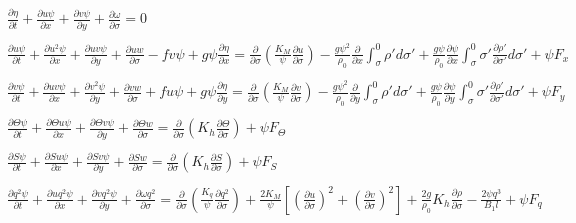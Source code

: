 \documentclass[oribibl]{llncs}
\begin{document}
\begin{eqnarray}
&&\frac{\partial \eta}{\partial t} + \frac{\partial u\psi}{\partial x}+ \frac{\partial v\psi}{\partial y}+ \frac{\partial \omega}{\partial \sigma}=0  \label{eq:final1}\\ 
\nonumber \\ 
&&\frac{\partial u\psi}{\partial t}  +\frac{\partial u^2\psi}{\partial x} +\frac{\partial uv\psi}{\partial y}+ \frac{\partial uw}{\partial \sigma}-fv\psi+g\psi\frac{\partial \eta}{\partial x} = \frac{\partial}{\partial \sigma}\left( \frac{K_M}{\psi}\frac{\partial u}{\partial \sigma} \right) - \frac{g\psi^2}{\rho_0} \frac{\partial}{\partial x} \int_\sigma^0 \rho' d \sigma' + \frac{g\psi}{\rho_0}\frac{\partial \psi}{\partial x} \int_\sigma^0 \sigma' \frac{\partial \rho'}{\partial \sigma'} d \sigma' + \psi F_x  \label{eq:final2}\nonumber \\  
\\ 
&&\frac{\partial v\psi}{\partial t}  +\frac{\partial uv\psi}{\partial x} +\frac{\partial v^2\psi}{\partial y} + \frac{\partial vw}{\partial \sigma} +fu\psi+g\psi\frac{\partial \eta}{\partial y} = \frac{\partial}{\partial \sigma}\left( \frac{K_M}{\psi}\frac{\partial v}{\partial \sigma} \right) - \frac{g\psi^2}{\rho_0} \frac{\partial}{\partial y} \int_\sigma^0 \rho' d \sigma' + \frac{g\psi}{\rho_0}\frac{\partial \psi}{\partial y} \int_\sigma^0 \sigma' \frac{\partial \rho'}{\partial \sigma'} d \sigma' + \psi F_y  \label{eq:final3}\nonumber \\  
\\  
&&\frac{\partial \Theta \psi}{\partial t}+\frac{\partial \Theta u\psi}{\partial x}+\frac{\partial \Theta v\psi}{\partial y}+\frac{\partial \Theta w}{\partial \sigma} = \frac{\partial}{\partial \sigma}  \left ( K_h \frac{\partial \Theta }{\partial \sigma} \right) +\psi F_\Theta  \label{eq:final4}\\ 
\nonumber \\ 
&&\frac{\partial S\psi}{\partial t}+\frac{\partial Su\psi}{\partial x}+\frac{\partial Sv\psi}{\partial y}+\frac{\partial Sw}{\partial \sigma} = \frac{\partial}{\partial \sigma}  \left ( K_h \frac{\partial S}{\partial \sigma} \right) +\psi F_S \label{eq:final5} \\ 
\nonumber \\ 
&&\frac{\partial q^2\psi}{\partial t} + \frac{\partial uq^2\psi}{\partial x} +\frac{\partial vq^2\psi}{\partial y} + \frac{\partial \omega q^2}{\partial \sigma}  = \frac{\partial}{\partial \sigma} \left( \frac{K_q}{\psi}  \frac{\partial q^2}{\partial \sigma} \right)+\frac{2K_M}{\psi}\left[ \left( \frac{\partial u}{\partial \sigma}\right)^2 + \left( \frac{\partial v}{\partial \sigma}\right)^2 \right] + \frac{2g}{\rho_0}K_h\frac{\partial \rho}{\partial \sigma} - \frac{2\psi q^3}{B_1 l} + \psi F_q  \label{eq:final6}\nonumber \\  

\end{eqnarray}
\end{document}
